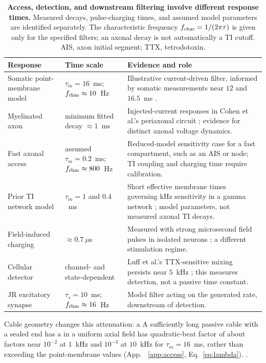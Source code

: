 \documentclass[11pt,a4paper]{article}
\providecommand{\DIFaddtex}[1]{{\protect\color{blue} \sf #1}} %
\providecommand{\DIFdeltex}[1]{{\protect\color{red} \scriptsize #1}} %
\providecommand{\DIFaddbegin}{} %
\providecommand{\DIFaddend}{} %
\providecommand{\DIFdelbegin}{} %
\providecommand{\DIFdelend}{} %
\providecommand{\DIFadd}[1]{\texorpdfstring{\DIFaddtex{#1}}{#1}} %
\providecommand{\DIFdel}[1]{\texorpdfstring{\DIFdeltex{#1}}{}} %
\begin{document}
\DIFaddend \begin{table}[h]
\centering\small
\renewcommand{\arraystretch}{1.15}
\begin{tabular}{@{}>{\raggedright\arraybackslash}p{2.8cm}
>{\raggedright\arraybackslash}p{3.5cm}
>{\raggedright\arraybackslash}p{8.6cm}@{}}
\toprule
Response & Time scale & Evidence and role \\
\midrule
Somatic point-membrane model & $\tau_m=16$~ms; $f_{\rm char}\approx10$~Hz &
Illustrative current-driven filter, informed by somatic measurements near $12$ and $16.5$~ms
\cite{deitcher2017,eyal2016}. \\
Myelinated axon & minimum fitted decay $\approx1$~ms &
Injected-current responses in Cohen et al.'s periaxonal circuit
\cite{cohen2020periaxonal}; evidence for distinct axonal voltage dynamics. \\
Fast axonal access & assumed $\tau_m=0.2$~ms; $f_{\rm char}\approx800$~Hz &
Reduced-model sensitivity case for a fast compartment, such as an AIS or node;
TI coupling and charging time require calibration. \\
Prior TI network model & $\tau_m=1$ and $0.4$~ms &
Short effective membrane times governing kHz sensitivity in a gamma network
\cite{esmaeilpour2021}; model parameters, not measured axonal TI decays. \\
Field-induced charging & $\approx0.7~\mu$s &
Measured with strong microsecond field pulses in isolated neurons
\cite{semenov2025}; a different stimulation regime. \\
Cellular detector & channel- and state-dependent &
Luff et al.'s TTX-sensitive mixing persists near $5$~kHz
\cite{luff2024mixer}; this measures detection, not a passive time constant. \\
JR excitatory synapse & $\tau_s=10$~ms; $f_{\rm char}\approx16$~Hz &
Model filter acting on the generated rate, downstream of detection. \\
\bottomrule
\end{tabular}
\caption{\textbf{Access, detection, and downstream filtering involve different response
times.} Measured decays, pulse-charging times, and assumed model parameters are
identified separately. The characteristic frequency $f_{\rm char}=1/(2\pi\tau)$
is given only for the specified filters; an axonal decay is not automatically a TI
cutoff. AIS, axon initial segment; TTX, tetrodotoxin.}
\label{tab:doors}
\end{table}

\DIFdelbegin \DIFdel{Cable geometry changes this attenuation: a }\DIFdelend \DIFaddbegin \DIFadd{A sufficiently }\DIFaddend long passive cable with a sealed end \DIFdelbegin \DIFdel{has a }\DIFdelend \DIFaddbegin \DIFadd{in a uniform axial field
has }\DIFaddend quadratic-beat \DIFdelbegin \DIFdel{factor of about }\DIFdelend \DIFaddbegin \DIFadd{factors near }\DIFaddend $10^{-2}$ at $1$~kHz and $10^{-3}$ at
$10$~kHz for $\tau_m=16$~ms, \DIFdelbegin \DIFdel{rather than }\DIFdelend \DIFaddbegin \DIFadd{exceeding }\DIFaddend the point-membrane values\DIFdelbegin \DIFdel{(App.
~\ref{app:access}, Eq.~\eqref{eq:lambda}).
}\DIFdelend \DIFaddbegin \DIFadd{.
}\DIFaddend
\end{document}
